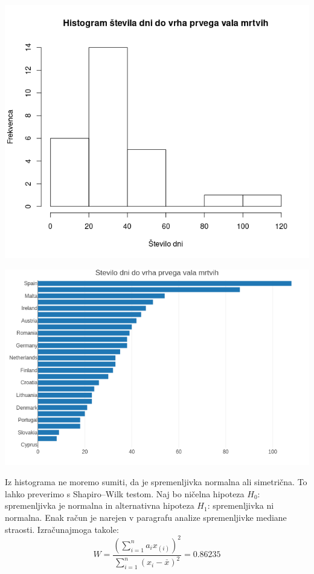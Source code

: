 \documentclass[a4paper,11pt]{article}
\begin{document}
\begin{center}
\includegraphics[scale=0.6]{histogram_st_dni_do_peaka_mrtvih}\\
\end{center}
\begin{center}
\includegraphics[scale=0.6]{barplot_st_dni_do_peaka_mrtvih}\\
\end{center}
Iz histograma ne moremo sumiti, da je spremenljivka normalna ali simetrična. To lahko preverimo s Shapiro–Wilk testom. Naj bo ničelna hipoteza \(H_0\): spremenljivka je normalna in alternativna hipoteza \(H_1\): spremenljivka ni normalna. Enak račun je narejen v paragrafu analize spremenljivke mediane straosti. Izračunajmoga takole:
\[W = \frac{(\sum_{i = 1}^{n}a_i x_{(i)})^2}{\sum_{i = 1}^{n}(x_i - \overset{\_}{x})^2} = 0.86235\]
\end{document}
